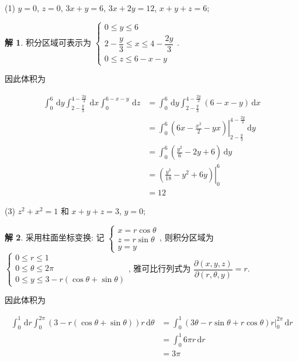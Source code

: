 \documentclass[a4paper,12pt]{article}
\theoremstyle{definition}
\newtheorem*{sol}{解}
\begin{document}
(1) $y=0$, $z=0$, $3x+y=6$, $3x+2y=12$, $x+y+z=6$;
\begin{sol}
    积分区域可表示为 $\begin{cases}
            0\leq y\leq 6                            \\
            2-\dfrac{y}{3}\leq x\leq 4-\dfrac{2y}{3} \\
            0\leq z\leq 6-x-y
        \end{cases}$.

    因此体积为

    \begin{align*}
        \int_0^6\,\mathrm{d}y\int_{2-\frac{y}{3}}^{4-\frac{2y}{3}}\,\mathrm{d}x\int_0^{6-x-y}\,\mathrm{d}z
         & =\int_0^6\,\mathrm{d}y\int_{2-\frac{y}{3}}^{4-\frac{2y}{3}}(6-x-y)\,\mathrm{d}x                      \\
         & =\int_0^6\left.\left(6x-\frac{x^2}{2}-yx\right)\right|_{2-\frac{y}{3}}^{4-\frac{2y}{3}}\,\mathrm{d}y \\
         & =\int_0^6\left(\frac{y^2}{6}-2y+6\right)\,\mathrm{d}y                                                \\
         & =\left.\left(\frac{y^3}{18}-y^2+6y\right)\right|_0^6                                                 \\
         & =12
    \end{align*}
\end{sol}
(3) $z^2+x^2=1$ 和 $x+y+z=3$, $y=0$;
\begin{sol}
    采用柱面坐标变换: 记 $\begin{cases}
            x=r\cos\theta \\
            z=r\sin\theta \\
            y=y
        \end{cases}$, 则积分区域为 $\begin{cases}
            0\leq r\leq 1         \\
            0\leq \theta\leq 2\pi \\
            0\leq y\leq 3-r(\cos\theta+\sin\theta)
        \end{cases}$, 雅可比行列式为 $\dfrac{\partial(x,y,z)}{\partial(r,\theta,y)}=r$.

    因此体积为

    \begin{align*}
        \int_0^1\,\mathrm{d}r\int_0^{2\pi}(3-r(\cos\theta+\sin\theta))r\,\mathrm{d}\theta
         & =\int_0^1\left.\left(3\theta-r\sin\theta+r\cos\theta\right)r\right|_0^{2\pi}\,\mathrm{d}r \\
         & =\int_0^1 6\pi r\,\mathrm{d}r                                                             \\
         & =3\pi
    \end{align*}
\end{sol}
\end{document}
